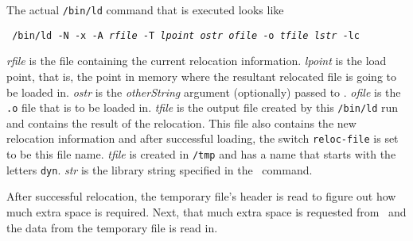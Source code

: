 The actual \verb!/bin/ld! command that is executed looks like
\begin{center}
\tt
/bin/ld -N -x -A {\em rfile\/} -T {\em lpoint\/} {\em ostr\/}
{\em ofile\/} -o {\em tfile\/} {\em lstr\/} -lc
\end{center}
{\em rfile\/} is the file containing the current relocation
information.
{\em lpoint\/} is the load point, that is, the point in memory where
the resultant relocated file is going to be loaded in.
{\em ostr\/} is the {\em otherString\/} argument (optionally) passed
to \lf.
{\em ofile\/} is the {\tt .o} file that is to be loaded in.
{\em tfile\/} is the output file created by this \verb!/bin/ld! run
and contains the result of the relocation.
This file also contains the new relocation information and after
successful loading, the switch {\tt reloc-file} is set to be this file
name.
{\em tfile\/} is created in \verb!/tmp! and has a name that starts
with the letters {\tt dyn}.
{\em str\/} is the library string specified in the \lf\ command.

After successful relocation,
the temporary file's header is read to figure out how much extra space
is required.
Next, that much extra space is requested from \unix\ and the data from
the temporary file is read in.

